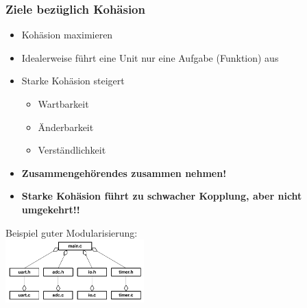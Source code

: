 \subsubsection{Ziele bezüglich Kohäsion}
\begin{multicols}{2}
%

\begin{itemize}
  \item Kohäsion maximieren
  \item Idealerweise führt eine Unit nur eine Aufgabe (Funktion) aus
  \item Starke Kohäsion steigert
  \begin{itemize}
    \item Wartbarkeit
    \item Änderbarkeit
    \item Verständlichkeit
  \end{itemize}
  \item \textbf{Zusammengehörendes zusammen nehmen!}
  \item \textbf{Starke Kohäsion führt zu schwacher Kopplung, aber nicht umgekehrt!!}
\end{itemize}
\columnbreak
\begin{center}
Beispiel guter Modularisierung:\\
\includegraphics[width=0.4\textwidth]{images/Modularisierung/GutesBeispielModularisierung.png}
\end{center}
\end{multicols}
